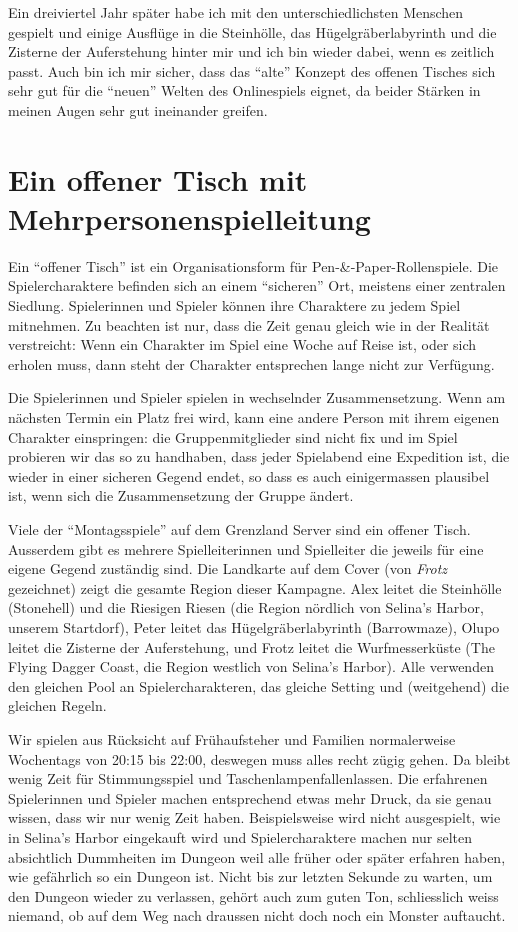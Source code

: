 \documentclass[11pt]{wbzine}
\begin{document}
\begin{multicols}{2}
Ein dreiviertel Jahr später habe ich mit den unterschiedlichsten
Menschen gespielt und einige Ausflüge in die Steinhölle, das
Hügelgräberlabyrinth und die Zisterne der Auferstehung hinter mir und
ich bin wieder dabei, wenn es zeitlich passt. Auch bin ich mir sicher,
dass das ``alte'' Konzept des offenen Tisches sich sehr gut für die ``neuen''
Welten des Onlinespiels eignet, da beider Stärken in meinen Augen sehr
gut ineinander greifen.


\section{Ein offener Tisch mit Mehrpersonenspielleitung}
\label{open-tables}
Ein “offener Tisch” ist ein Organisationsform für Pen-\&-Paper-Rollenspiele.
Die Spielercharaktere befinden sich an einem “sicheren” Ort, meistens einer
zentralen Siedlung. Spielerinnen und Spieler können ihre Charaktere zu jedem
Spiel mitnehmen. Zu beachten ist nur, dass die Zeit genau gleich wie in der
Realität verstreicht: Wenn ein Charakter im Spiel eine Woche auf Reise ist,
oder sich erholen muss, dann steht der Charakter entsprechen lange nicht zur
Verfügung.

Die Spielerinnen und Spieler spielen in wechselnder Zusammensetzung. Wenn am
nächsten Termin ein Platz frei wird, kann eine andere Person mit ihrem eigenen
Charakter einspringen: die Gruppenmitglieder sind nicht fix und im Spiel
probieren wir das so zu handhaben, dass jeder Spielabend eine Expedition ist,
die wieder in einer sicheren Gegend endet, so dass es auch einigermassen
plausibel ist, wenn sich die Zusammensetzung der Gruppe ändert.

Viele der ``Montagsspiele'' auf dem Grenzland Server sind ein
offener Tisch. Ausserdem gibt es mehrere Spielleiterinnen und
Spielleiter die jeweils für eine eigene Gegend zuständig sind. Die
Landkarte auf dem Cover (von \textit{Frotz} gezeichnet) zeigt die
gesamte Region dieser Kampagne. Alex leitet die Steinhölle
(Stonehell) und die Riesigen Riesen (die Region nördlich von
Selina's Harbor, unserem Startdorf), Peter leitet das
Hügelgräberlabyrinth (Barrowmaze), Olupo leitet die Zisterne der
Auferstehung, und Frotz leitet die Wurfmesserküste (The Flying
Dagger Coast, die Region westlich von Selina's Harbor). Alle
verwenden den gleichen Pool an Spielercharakteren, das gleiche
Setting und (weitgehend) die gleichen Regeln.

Wir spielen aus Rücksicht auf Frühaufsteher und Familien normalerweise
Wochentags von 20:15 bis 22:00, deswegen muss alles recht zügig gehen. Da
bleibt wenig Zeit für Stimmungsspiel und Taschenlampenfallenlassen. Die
erfahrenen Spielerinnen und Spieler machen entsprechend etwas mehr Druck, da
sie genau wissen, dass wir nur wenig Zeit haben. Beispielsweise wird nicht
ausgespielt, wie in Selina's Harbor eingekauft wird und Spielercharaktere
machen nur selten absichtlich Dummheiten im Dungeon weil alle früher oder
später erfahren haben, wie gefährlich so ein Dungeon ist. Nicht bis zur letzten
Sekunde zu warten, um den Dungeon wieder zu verlassen, gehört auch zum guten Ton,
schliesslich weiss niemand, ob auf dem Weg nach draussen nicht doch noch ein
Monster auftaucht.


\end{multicols}
\end{document}
